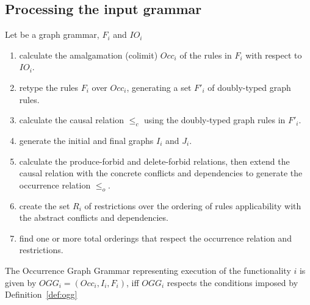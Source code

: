 \subsection{Processing the input grammar}


\begin{definition}\label{def:ogg-construction} Let \graphGrammar{} be a graph grammar, $F_i$ and $IO_i$

\begin{enumerate}
  \item\label{enum:construction-colimit} calculate the amalgamation (colimit) $Occ_i$ of the rules in $F_i$ with respect to $IO_i$.

\hfill\break

\item retype the rules $F_i$ over $Occ_i$, generating a set $F'_i$ of doubly-typed graph rules.

\item calculate the causal relation $\leq_{c}$ using the doubly-typed graph rules in $F'_i$.
\item\label{enum:construction-graphs} generate the initial and final graphs $I_i$ and $J_i$.
\item\label{enum:construction-occurrence} calculate the produce-forbid and delete-forbid relations, then extend the causal relation with the concrete conflicts and dependencies to generate the occurrence relation $\leq_o$.
\item\label{enum:construction-restriction} create the set $R_i$ of restrictions over the ordering of rules applicability with the abstract conflicts and dependencies.
\item find one or more total orderings that respect the occurrence relation and restrictions.
\end{enumerate}

  The Occurrence Graph Grammar representing execution of the functionality $i$ is given by $OGG_i = (Occ_i, I_i,F_i)$, iff $OGG_i$ respects the conditions imposed by Definition~\ref{def:ogg} 
\end{definition}

